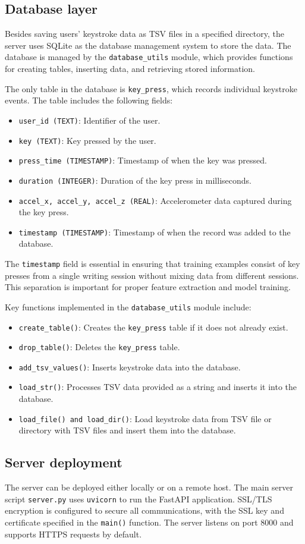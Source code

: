\subsection{Database layer}
Besides saving users' keystroke data as TSV files in a specified directory, the server uses SQLite as the database management system to store the data. The database is managed by the \texttt{database\_utils} module, which provides functions for creating tables, inserting data, and retrieving stored information.

The only table in the database is \texttt{key\_press}, which records individual keystroke events. The table includes the following fields:
\begin{itemize}
    \item \texttt{user\_id (TEXT)}: Identifier of the user.
    \item \texttt{key (TEXT)}: Key pressed by the user.
    \item \texttt{press\_time (TIMESTAMP)}: Timestamp of when the key was pressed.
    \item \texttt{duration (INTEGER)}: Duration of the key press in milliseconds.
    \item \texttt{accel\_x, accel\_y, accel\_z (REAL)}: Accelerometer data captured during the key press.
    \item \texttt{timestamp (TIMESTAMP)}: Timestamp of when the record was added to the database.
\end{itemize}
The \texttt{timestamp} field is essential in ensuring that training examples consist of key presses from a single writing session without mixing data from different sessions. This separation is important for proper feature extraction and model training.

Key functions implemented in the \texttt{database\_utils} module include:
\begin{itemize}
    \item \texttt{create\_table()}: Creates the \texttt{key\_press} table if it does not already exist.
    \item \texttt{drop\_table()}: Deletes the \texttt{key\_press} table.
    \item \texttt{add\_tsv\_values()}: Inserts keystroke data into the database.
    \item \texttt{load\_str()}: Processes TSV data provided as a string and inserts it into the database.
    \item \texttt{load\_file() and load\_dir()}: Load keystroke data from TSV file or directory with TSV files and insert them into the database.
\end{itemize}

\subsection{Server deployment}
The server can be deployed either locally or on a remote host. The main server script \texttt{server.py} uses \texttt{uvicorn} to run the FastAPI application. SSL/TLS encryption is configured to secure all communications, with the SSL key and certificate specified in the \texttt{main()} function. The server listens on port 8000 and supports HTTPS requests by default.